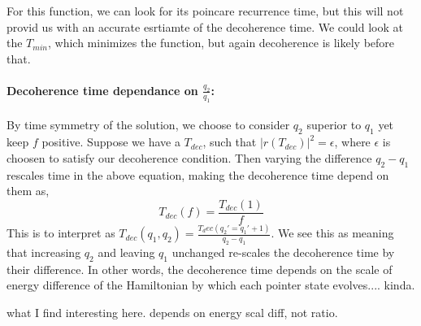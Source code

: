 \documentclass{article}
\begin{document}
For this function, we can look for its poincare recurrence time, but this will not provid us with an accurate esrtiamte of the decoherence time.
We could look at the $T_{min}$, which minimizes the function, but again decoherence is likely before that.

\paragraph{Decoherence time dependance on $\frac{q_2}{q_1}$:} By time symmetry of the solution, we choose to consider $q_2$ superior to $q_1$ yet keep $f$ positive.
Suppose we have a $T_{dec}$, such that $|r(T_{dec})|^2=\epsilon$, where $\epsilon$ is choosen to satisfy our decoherence condition. 
Then varying the difference $q_2-q_1$ rescales time in the above equation, making the decoherence time depend on them as,
\begin{equation}
    T_{dec}(f)=\frac{T_{dec}(1)}{f}
\end{equation}
This is to interpret as $T_{dec}(q_1,q_2)=\frac{T_dec(q_2'=q_1'+1)}{q_2-q_1}$. We see this as meaning that increasing $q_2$ and leaving $q_1$ unchanged re-scales the decoherence time by their difference. 
In other words, the decoherence time depends on the scale of energy difference of the Hamiltonian by which each pointer state evolves.... kinda.

what I find interesting here. depends on energy scal diff, not ratio.
\end{document}
